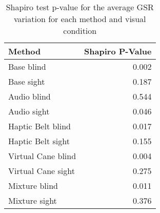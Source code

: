 
\begin{table}[!htb]
\centering
\caption{Shapiro test p-value for the average GSR variation for each method and visual condition}
\label{tab:shapiro_gsr_avg}
\begin{tabular}{lr}
\toprule
            Method &  Shapiro P-Value \\
\midrule
        Base blind &            0.002 \\
        Base sight &            0.187 \\
       Audio blind &            0.544 \\
       Audio sight &            0.046 \\
 Haptic Belt blind &            0.017 \\
 Haptic Belt sight &            0.155 \\
Virtual Cane blind &            0.004 \\
Virtual Cane sight &            0.275 \\
     Mixture blind &            0.011 \\
     Mixture sight &            0.376 \\
\bottomrule
\end{tabular}
\end{table}

